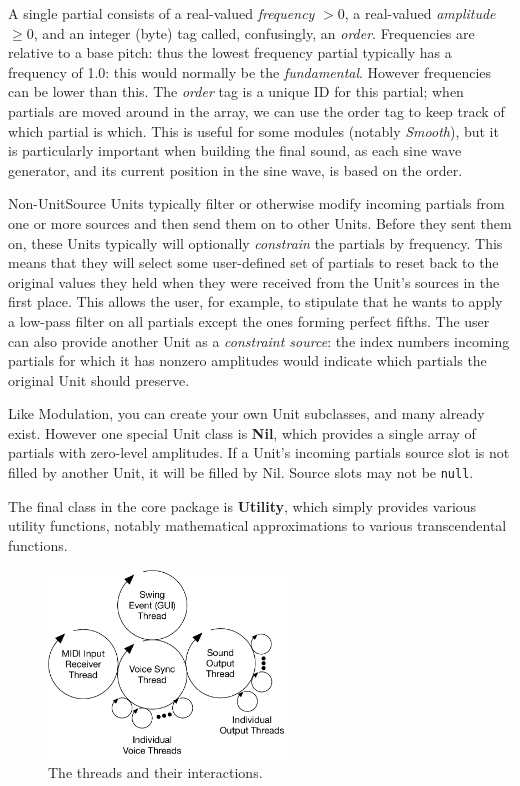 \documentclass{article}
\begin{document}
A single partial consists of a real-valued {\it frequency} \(> 0\), a real-valued {\it amplitude} \(\geq 0\), and an integer (byte) tag called, confusingly, an {\it order}.  Frequencies are relative to a base pitch: thus the lowest frequency partial typically has a frequency of 1.0: this would normally be the {\it fundamental}.   However frequencies can be lower than this.  The {\it order} tag is a unique ID for this partial; when partials are moved around in the array, we can use the order tag to keep track of which partial is which. This is useful for some modules (notably {\it Smooth}), but it is particularly important when building the final sound, as each sine wave generator, and its current position in the sine wave, is based on the order.

Non-UnitSource Units typically filter or otherwise modify incoming partials from one or more sources and then send them on to other Units.  Before they sent them on, these Units typically will optionally {\it constrain} the partials by frequency.  This means that they will select some user-defined set of partials to reset back to the original values they held when they were received from the Unit's sources in the first place.  This allows the user, for example, to stipulate that he wants to apply a low-pass filter on all partials except the ones forming perfect fifths.  The user can also provide another Unit as a {\it constraint source}: the index numbers incoming partials for which it has nonzero amplitudes would indicate which partials the original Unit should preserve. 

Like Modulation, you can create your own Unit subclasses, and many already exist.  However one special Unit class is {\bf Nil}, which provides a single array of partials with zero-level amplitudes.  If a Unit's incoming partials source slot is not filled by another Unit, it will be filled by Nil. Source slots may not be {\tt null}.

The final class in the core package is {\bf Utility}, which simply provides various utility functions, notably mathematical approximations to various transcendental functions.

\begin{figure}
\vspace{-1em}\includegraphics[width=2.5in]{Threads.pdf}
\vspace{-2em}
\caption{The threads and their interactions.}
\label{threads}
\end{figure}
\end{document}
